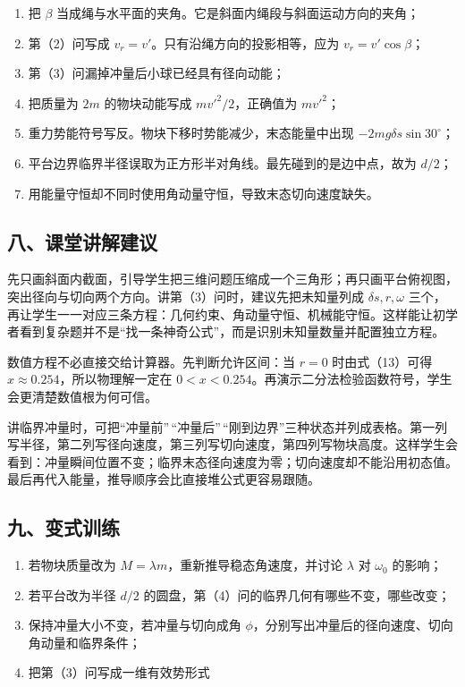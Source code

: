 \documentclass[12pt,a4paper,UTF8]{ctexart}
\newcommand{\tightlist}{\setlength{\itemsep}{0pt}\setlength{\parskip}{0pt}}
\begin{document}
\begin{enumerate}
\def\labelenumi{\arabic{enumi}.}
\tightlist
\item
  把 \(\beta\)
  当成绳与水平面的夹角。它是斜面内绳段与斜面运动方向的夹角；
\item
  第（2）问写成 \(v_r=v'\)。只有沿绳方向的投影相等，应为
  \(v_r=v'\cos\beta\)；
\item
  第（3）问漏掉冲量后小球已经具有径向动能；
\item
  把质量为 \(2m\) 的物块动能写成 \(mv'^2/2\)，正确值为 \(mv'^2\)；
\item
  重力势能符号写反。物块下移时势能减少，末态能量中出现
  \(-2mg\delta s\sin30^\circ\)；
\item
  平台边界临界半径误取为正方形半对角线。最先碰到的是边中点，故为
  \(d/2\)；
\item
  用能量守恒却不同时使用角动量守恒，导致末态切向速度缺失。
\end{enumerate}

\subsection{八、课堂讲解建议}\label{ux516bux8bfeux5802ux8bb2ux89e3ux5efaux8bae}

先只画斜面内截面，引导学生把三维问题压缩成一个三角形；再只画平台俯视图，突出径向与切向两个方向。讲第（3）问时，建议先把未知量列成
\(\delta s,r,\omega\)
三个，再让学生一一对应三条方程：几何约束、角动量守恒、机械能守恒。这样能让初学者看到复杂题并不是``找一条神奇公式''，而是识别未知量数量并配置独立方程。

数值方程不必直接交给计算器。先判断允许区间：当 \(r=0\) 时由式（13）可得
\(x\approx0.254\)，所以物理解一定在
\(0<x<0.254\)。再演示二分法检验函数符号，学生会更清楚数值根为何可信。

讲临界冲量时，可把``冲量前''\,``冲量后''\,``刚到边界''三种状态并列成表格。第一列写半径，第二列写径向速度，第三列写切向速度，第四列写物块高度。这样学生会看到：冲量瞬间位置不变；临界末态径向速度为零；切向速度却不能沿用初态值。最后再代入能量，推导顺序会比直接堆公式更容易跟随。

\subsection{九、变式训练}\label{ux4e5dux53d8ux5f0fux8badux7ec3}

\begin{enumerate}
\def\labelenumi{\arabic{enumi}.}
\tightlist
\item
  若物块质量改为 \(M=\lambda m\)，重新推导稳态角速度，并讨论 \(\lambda\)
  对 \(\omega_0\) 的影响；
\item
  若平台改为半径 \(d/2\)
  的圆盘，第（4）问的临界几何有哪些不变，哪些改变；
\item
  保持冲量大小不变，若冲量与切向成角
  \(\phi\)，分别写出冲量后的径向速度、切向角动量和临界条件；
\item
  把第（3）问写成一维有效势形式
\end{enumerate}
\end{document}
